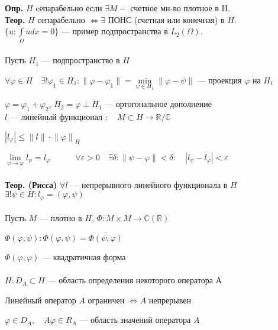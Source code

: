 \documentclass[12pt, a4paper]{article}
\begin{document}
\textbf{Опр.} $H$ cепарабельно если $ \exists M - $ счетное мн-во плотное в H. \\

\textbf{Теор.} $H$ сепарабельно $ \Leftrightarrow \exists $ ПОНС (счетная или конечная) в $H$. \\

$ \{ u: \int\limits_{\Omega}^{} u dx = 0 \} $ --- пример подпространства в $ L_2(\Omega) $. \\ \\

Пусть $ H_1 $ --- подпространство в $H$

$ \forall \varphi \in H \quad \exists ! \varphi_1 \in H_1: \| \varphi - \varphi_1 \| = \underset{\psi \in H_1}{\min}  \| \varphi - \psi \| $ --- проекция $\varphi$ на $H_1$

$ \varphi = \varphi_1 + \varphi_2 $, \quad \quad $ H_2 = \varphi \perp H_1 $ --- ортогональное дополнение \\

$l$ --- линейный функционал $: \quad M \subset H \rightarrow \mathbb{R}/\mathbb{C} $

$ |l_{\varphi}| \leq \|l\| \cdot {\|\varphi\|}_H $

$ \underset{\psi \rightarrow \varphi}{\lim} l_\psi = l_\varphi \quad \quad \quad \forall \varepsilon > 0 \quad \exists \delta: \| \psi - \varphi \| < \delta: \quad |l_\psi - l_\varphi| < \varepsilon$ \\ \\

\textbf{Теор. (Рисса)} $ \forall l $ --- непрерывного линейного функционала в $H$ $\exists! \psi \in H:  l_\varphi = (\varphi, \psi)$ \\ \\


Пусть $M$ --- плотно в $H$, \quad $\Phi: M \times M \rightarrow \mathbb{C} (\mathbb{R})  $

$ \Phi(\varphi, \psi): \Phi(\varphi, \psi) = \overline{\Phi(\psi, \varphi)} $

$ \Phi(\varphi, \varphi) $ --- квадратичная форма \\ \\


$ H: D_A \subset H $ --- область определения некоторого оператора А

Линейный оператор $A$ ограничен $\Leftrightarrow A$ непрерывен

$\varphi \in D_A, \quad A\varphi \in R_A$ --- область значений оператора $A$
\end{document}

